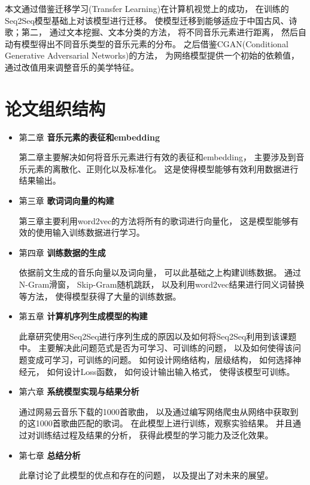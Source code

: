 本文通过借鉴迁移学习(Transfer Learning)在计算机视觉上的成功， 在训练的Seq2Seq模型基础上对该模型进行迁移。 使模型迁移到能够适应于中国古风、诗歌；第二， 通过文本挖掘、文本分类的方法， 将不同音乐元素进行距离， 然后自动有模型得出不同音乐类型的音乐元素的分布。 之后借鉴CGAN(Conditional
 Generative Adversarial Networks)的方法， 为网络模型提供一个初始的依赖值， 通过改值用来调整音乐的美学特征。 

\section{论文组织结构}


\begin{itemize}

\item 第二章 \textbf{音乐元素的表征和embedding}

第二章主要解决如何将音乐元素进行有效的表征和embedding， 主要涉及到音乐元素的离散化、正则化以及标准化。 这是使得模型能够有效利用数据进行结果输出。 

\item 第三章 \textbf{歌词词向量的构建}

第三章主要利用word2vec的方法将所有的歌词进行向量化， 这是模型能够有效的使用输入训练数据进行学习。

\item 第四章 \textbf{训练数据的生成}

依据前文生成的音乐向量以及词向量， 可以此基础之上构建训练数据。 通过N-Gram滑窗， Skip-Gram随机跳跃， 以及利用word2vec结果进行同义词替换等方法， 使得模型获得了大量的训练数据。 


\item 第五章 \textbf{计算机序列生成模型的构建}

此章研究使用Seq2Seq进行序列生成的原因以及如何将Seq2Seq利用到该课题中。 主要解决此问题范式是否为可学习、可训练的问题， 以及如何使得该问题变成可学习，可训练的问题。 如何设计网络结构，层级结构， 如何选择神经元， 如何设计Loss函数， 如何设计输出输入格式， 使得该模型可训练。 

\item 第六章 \textbf{系统模型实现与结果分析}

通过网易云音乐下载的1000首歌曲， 以及通过编写网络爬虫从网络中获取到的这1000首歌曲匹配的歌词。 在此模型上进行训练，观察实验结果。 并且通过对训练结过程及结果的分析， 获得此模型的学习能力及泛化效果。 



\item 第七章 \textbf{总结分析}

此章讨论了此模型的优点和存在的问题， 以及提出了对未来的展望。 

\end{itemize}
